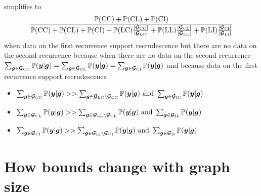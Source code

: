 \documentclass{article}
\begin{document}
simplifies to 
\begin{equation} \label{eq:s1_C_prop_max_no_data}
  \dfrac{
\mathbb{P}(\mathrm{C}\mathrm{C}) + 
\mathbb{P}(\mathrm{C}\mathrm{L}) + 
\mathbb{P}(\mathrm{C}\mathrm{I})}{
\mathbb{P}(\mathrm{C}\mathrm{C}) + 
\mathbb{P}(\mathrm{C}\mathrm{L}) + 
\mathbb{P}(\mathrm{C}\mathrm{I}) + 
\mathbb{P}(\mathrm{L}\mathrm{C})\frac{|\bm{\mathcal{G}}_{\mathrm{C}\mathrm{C}}|}{|\bm{\mathcal{G}}_{\mathrm{L}\mathrm{C}}|} + 
\mathbb{P}(\mathrm{L}\mathrm{L})\frac{|\bm{\mathcal{G}}_{\mathrm{C}\mathrm{L}}|}{|\bm{\mathcal{G}}_{\mathrm{L}\mathrm{L}}|} + 
\mathbb{P}(\mathrm{L}\mathrm{I})\frac{|\bm{\mathcal{G}}_{\mathrm{C}\mathrm{I}}|}{|\bm{\mathcal{G}}_{\mathrm{L}\mathrm{I}}|}}  
\end{equation}
when data on the first recurrence support recrudescence but there are no data on the second recurrence because when there are no data on the second recurrence $\sum_{\bm{g}\in\bm{\mathcal{G}}_{\mathrm{C}\mathrm{C}}} \mathbb{P}(\bm{y} | \bm{g})= 
\sum_{\bm{g}\in\bm{\mathcal{G}}_{\mathrm{C}\mathrm{L}}} \mathbb{P}(\bm{y} | \bm{g})= 
\sum_{\bm{g}\in\bm{\mathcal{G}}_{\mathrm{C}\mathrm{I}}} \mathbb{P}(\bm{y} | \bm{g})$ and because data on the first recurrence support recrudescence
\begin{itemize}
    \item $\sum_{\bm{g}\in\bm{\mathcal{G}}_{\mathrm{C}\mathrm{C}}} \mathbb{P}(\bm{y} | \bm{g}) >> \sum_{\bm{g}\in\bm{\mathcal{G}}_{\mathrm{L}\mathrm{C}}\setminus\bm{\mathcal{G}}_{\mathrm{C}\mathrm{C}}}
    \mathbb{P}(\bm{y} | \bm{g}) \text{ and } \sum_{\bm{g}\in\bm{\mathcal{G}}_{\mathrm{I}\mathrm{C}}} \mathbb{P}(\bm{y} | \bm{g})$
    \item $\sum_{\bm{g}\in\bm{\mathcal{G}}_{\mathrm{C}\mathrm{L}}} \mathbb{P}(\bm{y} | \bm{g}) >> \sum_{\bm{g}\in\bm{\mathcal{G}}_{\mathrm{L}\mathrm{L}}\setminus\bm{\mathcal{G}}_{\mathrm{C}\mathrm{L}}}
    \mathbb{P}(\bm{y} | \bm{g}) \text{ and } \sum_{\bm{g}\in\bm{\mathcal{G}}_{\mathrm{I}\mathrm{L}}} \mathbb{P}(\bm{y} | \bm{g})$
    \item $\sum_{\bm{g}\in\bm{\mathcal{G}}_{\mathrm{C}\mathrm{I}}} \mathbb{P}(\bm{y} | \bm{g}) >> \sum_{\bm{g}\in\bm{\mathcal{G}}_{\mathrm{L}\mathrm{I}}\setminus\bm{\mathcal{G}}_{\mathrm{C}\mathrm{I}}}
    \mathbb{P}(\bm{y} | \bm{g}) \text{ and } \sum_{\bm{g}\in\bm{\mathcal{G}}_{\mathrm{I}\mathrm{I}}} \mathbb{P}(\bm{y} | \bm{g})$
\end{itemize}
 
\section*{How bounds change with graph size}
\end{document}
